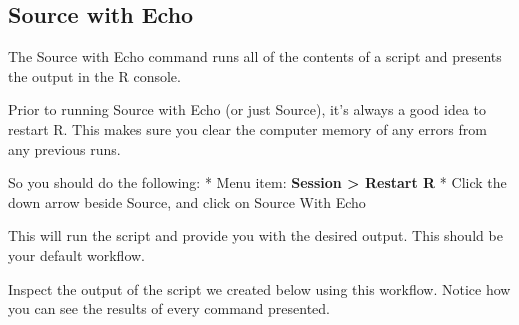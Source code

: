 \documentclass[
]{krantz}
\begin{document}
\hypertarget{source-with-echo}{%
\subsection{Source with Echo}\label{source-with-echo}}

The Source with Echo command runs all of the contents of a script and presents the output in the R console.

Prior to running Source with Echo (or just Source), it's always a good idea to restart R. This makes sure you clear the computer memory of any errors from any previous runs.

So you should do the following:
* Menu item: \textbf{Session \textgreater{} Restart R}
* Click the down arrow beside Source, and click on Source With Echo

This will run the script and provide you with the desired output. This should be your default workflow.

Inspect the output of the script we created below using this workflow. Notice how you can see the results of every command presented.
\end{document}
